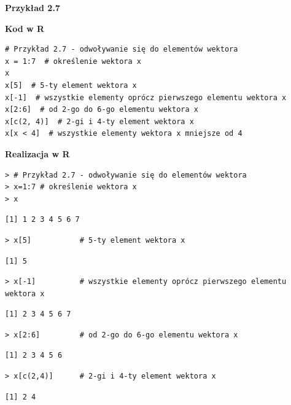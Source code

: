 \documentclass[12pt,B5paper,]{book}
\begin{document}
\vspace{0.8cm}

\textbf{Przykład 2.7}

\textbf{Kod w R}

\begin{verbatim}
# Przykład 2.7 - odwoływanie się do elementów wektora
x = 1:7  # określenie wektora x
x
x[5]  # 5-ty element wektora x
x[-1]  # wszystkie elementy oprócz pierwszego elementu wektora x
x[2:6]  # od 2-go do 6-go elementu wektora x
x[c(2, 4)]  # 2-gi i 4-ty element wektora x
x[x < 4]  # wszystkie elementy wektora x mniejsze od 4
\end{verbatim}

\newpage

\textbf{Realizacja w R}

\begin{verbatim}
> # Przykład 2.7 - odwoływanie się do elementów wektora
> x=1:7 # określenie wektora x
> x
\end{verbatim}

\begin{verbatim}
[1] 1 2 3 4 5 6 7
\end{verbatim}

\begin{verbatim}
> x[5]           # 5-ty element wektora x
\end{verbatim}

\begin{verbatim}
[1] 5
\end{verbatim}

\begin{verbatim}
> x[-1]          # wszystkie elementy oprócz pierwszego elementu wektora x
\end{verbatim}

\begin{verbatim}
[1] 2 3 4 5 6 7
\end{verbatim}

\begin{verbatim}
> x[2:6]         # od 2-go do 6-go elementu wektora x
\end{verbatim}

\begin{verbatim}
[1] 2 3 4 5 6
\end{verbatim}

\begin{verbatim}
> x[c(2,4)]      # 2-gi i 4-ty element wektora x
\end{verbatim}

\begin{verbatim}
[1] 2 4
\end{verbatim}
\end{document}
